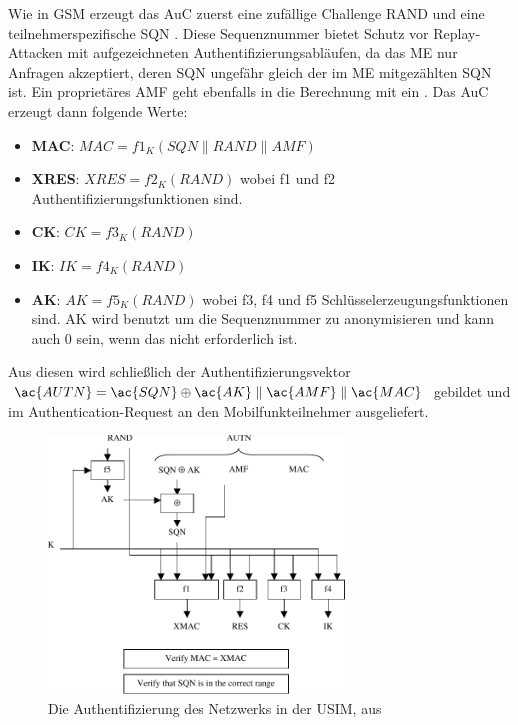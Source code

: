 Wie in \ac{GSM} erzeugt das \ac{AuC} zuerst eine zufällige Challenge \ac{RAND} und eine teilnehmerspezifische \ac{SQN} . Diese Sequenznummer bietet Schutz vor Replay-Attacken mit aufgezeichneten Authentifizierungsabläufen, da das \ac{ME} nur Anfragen akzeptiert, deren \ac{SQN} ungefähr gleich der im \ac{ME} mitgezählten \ac{SQN} ist. Ein proprietäres \ac{AMF} geht ebenfalls in die Berechnung mit ein .
Das \ac{AuC} erzeugt dann folgende Werte:
\begin{itemize}
\item \textbf{\acf{MAC}}: $MAC = f1_K (SQN \parallel RAND \parallel AMF)$ 
\item \textbf{\acf{XRES}}: $XRES = f2_K (RAND)$ wobei f1 und f2 Authentifizierungsfunktionen sind.
\item \textbf{\acf{CK}}: $CK = f3_K (RAND)$
\item \textbf{\acf{IK}}: $IK = f4_K (RAND)$
\item \textbf{\acf{AK}}: $AK = f5_K (RAND)$ wobei f3, f4 und f5 Schlüsselerzeugungsfunktionen sind. \ac{AK} wird benutzt um die Sequenznummer zu anonymisieren und kann auch 0 sein, wenn das nicht erforderlich ist.
\end{itemize}
Aus diesen wird schließlich der Authentifizierungsvektor $\ac{AUTN} = \ac{SQN} \oplus \ac{AK} \parallel \ac{AMF} \parallel \ac{MAC}$ gebildet und im Authentication-Request an den Mobilfunkteilnehmer ausgeliefert.

\begin{figure}[H]
  \begin{center}
    \includegraphics[width=0.7\textwidth]{figures/33102_fig_9}
  \end{center}
  \caption[Die Authentifizierung des Netzwerks in der USIM]{Die Authentifizierung des Netzwerks in der \ac{USIM}, aus } \label{fig:auth-in-usim}
\end{figure}


